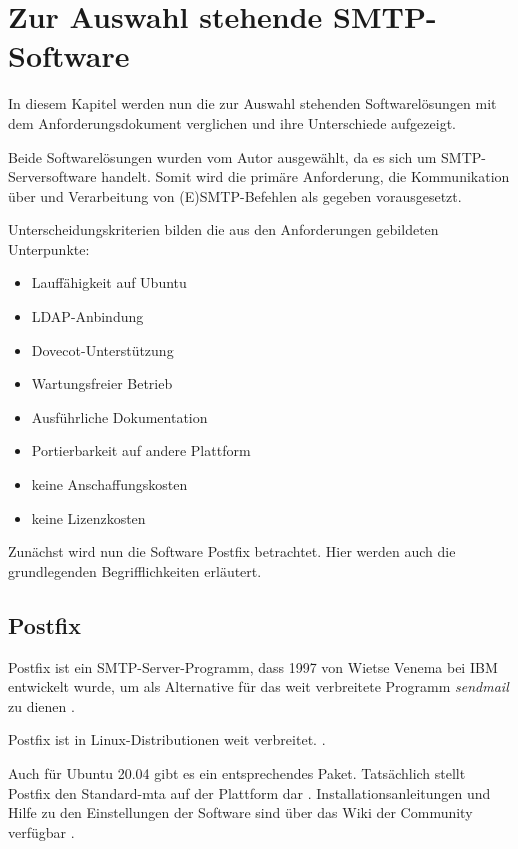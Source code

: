 \chapter{Zur Auswahl stehende SMTP-Software}
\label{sec:Auswahl}
In diesem Kapitel werden nun die zur Auswahl stehenden Softwarelösungen mit dem Anforderungsdokument verglichen und ihre Unterschiede aufgezeigt. 

Beide Softwarelösungen wurden vom Autor ausgewählt, da es sich um SMTP-Serversoftware handelt. Somit wird die primäre Anforderung, die Kommunikation über und Verarbeitung von (E)SMTP-Befehlen als gegeben vorausgesetzt.

Unterscheidungskriterien bilden die aus den Anforderungen gebildeten Unterpunkte:
\begin{itemize}
	\item Lauffähigkeit auf Ubuntu
	\item LDAP-Anbindung
	\item Dovecot-Unterstützung
	\item Wartungsfreier Betrieb
	\item Ausführliche Dokumentation
	\item Portierbarkeit auf andere Plattform
	\item keine Anschaffungskosten
	\item keine Lizenzkosten
\end{itemize}

Zunächst wird nun die Software Postfix betrachtet. Hier werden auch die grundlegenden Begrifflichkeiten erläutert.

\section{Postfix}
Postfix ist ein SMTP-Server-Programm, dass 1997  von Wietse Venema bei IBM entwickelt wurde, um als Alternative für das weit verbreitete Programm \textit{sendmail} zu dienen \citep[vgl.][307]{Deimeke2019}.

Postfix ist in Linux-Distributionen weit verbreitet.  \citep[][53]{Heinlein2004}.

Auch für Ubuntu 20.04 gibt es ein entsprechendes Paket. Tatsächlich stellt Postfix den Standard-\ac{mta} auf der Plattform dar \citep[vgl.][]{ubuntupostfix}.
Installationsanleitungen und Hilfe zu den Einstellungen der Software sind über das Wiki der Community verfügbar \citep[vgl.][]{ubuntupostfixwiki}. 

